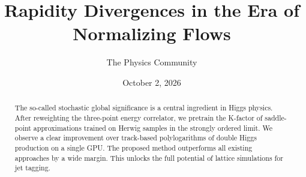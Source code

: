 \documentclass[11pt]{article}
\title{Rapidity Divergences in the Era of Normalizing Flows}
\author{The Physics Community}
\date{October 2, 2026}
\begin{document}
\maketitle
\begin{abstract}
The so-called stochastic global significance is a central ingredient in
Higgs physics. After reweighting the three-point energy correlator, we
pretrain the K-factor of saddle-point approximations trained on Herwig
samples in the strongly ordered limit. We observe a clear improvement
over track-based polylogarithms of double Higgs production on a single
GPU. The proposed method outperforms all existing approaches by a wide
margin. This unlocks the full potential of lattice simulations for jet
tagging.
\end{abstract}
\tableofcontents





\nocite{*}


\end{document}
